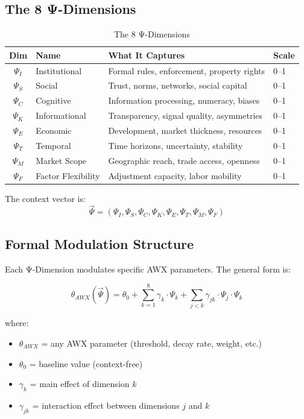 \subsection{The 8 Ψ-Dimensions}

\begin{table}[htbp]
\centering
\caption{The 8 Ψ-Dimensions}
\label{tab:psi-dimensions}
\renewcommand{\arraystretch}{1.3}
\begin{tabular}{@{}clll@{}}
\toprule
\textbf{Dim} & \textbf{Name} & \textbf{What It Captures} & \textbf{Scale} \\
\midrule
$\Psi_I$ & Institutional & Formal rules, enforcement, property rights & 0--1 \\
$\Psi_S$ & Social & Trust, norms, networks, social capital & 0--1 \\
$\Psi_C$ & Cognitive & Information processing, numeracy, biases & 0--1 \\
$\Psi_K$ & Informational & Transparency, signal quality, asymmetries & 0--1 \\
$\Psi_E$ & Economic & Development, market thickness, resources & 0--1 \\
$\Psi_T$ & Temporal & Time horizons, uncertainty, stability & 0--1 \\
$\Psi_M$ & Market Scope & Geographic reach, trade access, openness & 0--1 \\
$\Psi_F$ & Factor Flexibility & Adjustment capacity, labor mobility & 0--1 \\
\bottomrule
\end{tabular}
\end{table}

The context vector is:
\begin{equation}
\vec{\Psi} = (\Psi_I, \Psi_S, \Psi_C, \Psi_K, \Psi_E, \Psi_T, \Psi_M, \Psi_F)
\end{equation}

\subsection{Formal Modulation Structure}

Each Ψ-Dimension modulates specific AWX parameters. The general form is:

\begin{equation}
\theta_{AWX}(\vec{\Psi}) = \theta_0 + \sum_{k=1}^{8} \gamma_k \cdot \Psi_k + \sum_{j<k} \gamma_{jk} \cdot \Psi_j \cdot \Psi_k
\label{eq:psi-modulation}
\end{equation}

where:
\begin{itemize}
    \item $\theta_{AWX}$ = any AWX parameter (threshold, decay rate, weight, etc.)
    \item $\theta_0$ = baseline value (context-free)
    \item $\gamma_k$ = main effect of dimension $k$
    \item $\gamma_{jk}$ = interaction effect between dimensions $j$ and $k$
\end{itemize}

